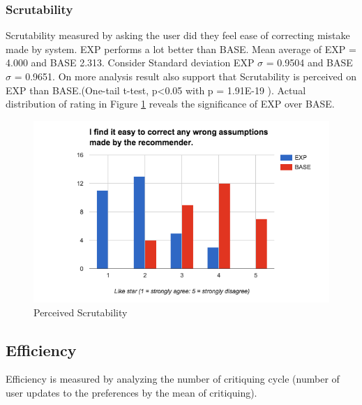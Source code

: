 \subsubsection{Scrutability}
Scrutability measured by asking the user did they feel ease of correcting mistake made by system. EXP performs a lot better than BASE. Mean average of EXP = 4.000 and BASE 2.313. Consider Standard deviation EXP ${\sigma}$ = 0.9504 and BASE ${\sigma}$ = 0.9651. On more analysis result also support that Scrutability is perceived on EXP than BASE.(One-tail t-test, p<0.05 with p = 1.91E-19
). Actual distribution of rating in Figure \ref{fig:ch5_stat_scrutability} reveals the significance of EXP over BASE.
\begin{figure}[h]
	\centering
	\includegraphics[width= 1\linewidth]{figures/ch5_stat_scrutability}
	\caption{Perceived Scrutability}
	\label{fig:ch5_stat_scrutability}
\end{figure}
\newpage
\subsection{Efficiency}
Efficiency is measured by analyzing the number of critiquing cycle (number of user updates to the preferences by the mean of critiquing). 
